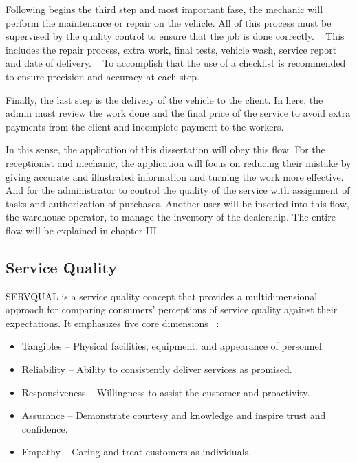 Following begins the third step and most important fase, the mechanic will perform the maintenance or repair on the vehicle. 
All of this process must be supervised by the quality control to ensure that the job is done correctly. ~\cite{Setting_the_after_sale_process}
This includes the repair process, extra work, final tests, vehicle wash, service report and date of delivery. ~\cite{Setting_the_after_sale_process}
To accomplish that the use of a checklist is recommended to ensure precision and accuracy at each step. ~\cite{Setting_the_after_sale_process}

Finally, the last step is the delivery of the vehicle to the client. 
In here, the admin must review the work done and the final price of the service to avoid extra payments from the client and incomplete payment to the workers. ~\cite{Setting_the_after_sale_process}

In this sense, the application of this dissertation will obey this flow.
For the receptionist and mechanic, the application will focus on reducing their mistake by giving accurate and illustrated information and turning the work more effective.
And for the administrator to control the quality of the service with assignment of tasks and authorization of purchases.  
Another user will be inserted into this flow, the warehouse operator, to manage the inventory of the dealership. 
The entire flow will be explained in chapter III. 

\subsection{Service Quality}
SERVQUAL is a service quality concept that provides a multidimensional approach for comparing consumers' perceptions of service quality against their expectations. 
It emphasizes five core dimensions ~\cite{SERVQUAL_OLD}:

\begin{itemize}
  \item Tangibles – Physical facilities, equipment, and appearance of personnel.
  \item Reliability – Ability to consistently deliver services as promised.
  \item Responsiveness – Willingness to assist the customer and proactivity.
  \item Assurance – Demonstrate courtesy and knowledge and inspire trust and confidence.
  \item Empathy – Caring and treat customers as individuals.
\end{itemize}

